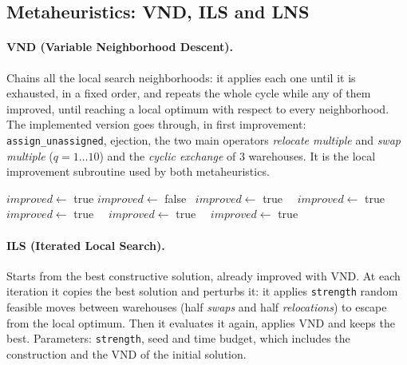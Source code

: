 \documentclass[11pt,a4paper]{article}
\newcommand{\code}[1]{\texttt{#1}}
\begin{document}
\subsection{Metaheuristics: VND, ILS and LNS}
\paragraph{VND (Variable Neighborhood Descent).} Chains all the local search neighborhoods: it
applies each one until it is exhausted, in a fixed order, and repeats the whole cycle while any of
them improved, until reaching a local optimum with respect to every neighborhood. The implemented
version goes through, in first improvement: \code{assign\_unassigned}, ejection, the two main
operators \emph{relocate multiple} and \emph{swap multiple} ($q{=}1\dots10$) and the
\emph{cyclic exchange} of 3 warehouses. It is the local improvement subroutine used by both
metaheuristics.

\begin{algorithm}[H]
\caption{Metaheuristic: VND (Variable Neighborhood Descent)}
\begin{algorithmic}[1]
  \State $improved \gets$ true
    \State $improved \gets$ false
    \ $improved \gets$ true\ \EndWhile
    \ $improved \gets$ true\ \EndWhile
      \ $improved \gets$ true\ \EndWhile
      \ $improved \gets$ true\ \EndWhile
    \EndFor
    \ $improved \gets$ true\ \EndWhile
  \EndWhile
\EndFunction
\end{algorithmic}
\end{algorithm}

\paragraph{ILS (Iterated Local Search).} Starts from the best constructive solution, already
improved with VND. At each iteration it copies the best solution and perturbs it: it applies
\code{strength} random feasible moves between warehouses (half \emph{swaps} and half
\emph{relocations}) to escape from the local optimum. Then it evaluates it again, applies VND and
keeps the best. Parameters: \code{strength}, seed and time budget, which includes the construction
and the VND of the initial solution.
\end{document}
